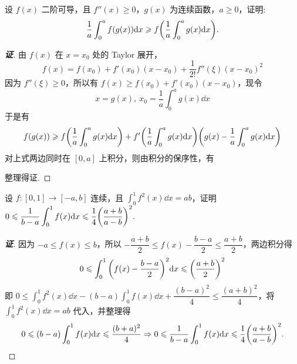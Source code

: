 \begin{example}
    设 $f(x)$ 二阶可导，且 $f''(x)\geqslant0$，$g(x)$ 为连续函数，$a\geqslant0$，证明:
    $$\dfrac{1}{a}\int_{0}^{a}f(g(x))\dd x\geqslant f\qty(\dfrac{1}{a}\int_{0}^{a}g(x)\dd x).$$
\end{example}
\begin{proof}[{\songti \textbf{证}}]
    由 $f(x)$ 在 $x=x_0$ 处的 Taylor 展开，
    $$f(x)=f(x_0)+f'(x_0)(x-x_0)+\dfrac{1}{2!}f''(\xi)(x-x_0)^2$$
    因为 $f''(\xi)\geqslant 0$，所以有 $f(x)\geqslant f(x_0)+f'(x_0)(x-x_0)$，现令
    $$x=g(x),~x_0=\dfrac{1}{a}\int_{0}^{a}g(x)\dd x$$
    于是有
    $$f(g(x))\geqslant f\qty(\dfrac{1}{a}\int_{0}^{a}g(x)\dd x)+f'\qty(\dfrac{1}{a}\int_{0}^{a}g(x)\dd x)\qty(g(x)-\dfrac{1}{a}\int_{0}^{a}g(x)\dd x)$$
    对上式两边同时在 $[0,a]$ 上积分，则由积分的保序性，有
    整理得证.
\end{proof}

\begin{example}
    设 $f:[0,1]\to[-a,b]$ 连续，且 $\displaystyle\int_{0}^{1}f^2(x)\dd x=ab$，证明 $\displaystyle0\leqslant \dfrac{1}{b-a}\int_{0}^{1}f(x)\dd x\leqslant \dfrac{1}{4}\qty(\dfrac{a+b}{a-b})^2.$
\end{example}
\begin{proof}[{\songti \textbf{证}}]
    因为 $-a\leqslant f(x)\leqslant b$，所以 $\displaystyle -\dfrac{a+b}{2}\leqslant f(x)-\dfrac{b-a}{2}\leqslant \dfrac{a+b}{2}$，两边积分得
    $$0\leqslant \int_{0}^{1}\qty(f(x)-\dfrac{b-a}{2})^2\dd x\leqslant \qty(\dfrac{a+b}{2})^2$$
    即 $\displaystyle 0\leqslant \int_{0}^{1}f^2(x)\dd x-(b-a)\int_{0}^{1}f(x)\dd x+\dfrac{(b-a)^2}{4}\leqslant \dfrac{(a+b)^2}{4}$，将 $\displaystyle\int_{0}^{1}f^2(x)\dd x=ab$ 代入，并整理得
    $$0\leqslant (b-a)\int_{0}^{1}f(x)\dd x\leqslant \dfrac{(b+a)^2}{4}\Rightarrow 0\leqslant \dfrac{1}{b-a}\int_{0}^{1}f(x)\dd x\leqslant \dfrac{1}{4}\qty(\dfrac{a+b}{a-b})^2.$$
\end{proof}

